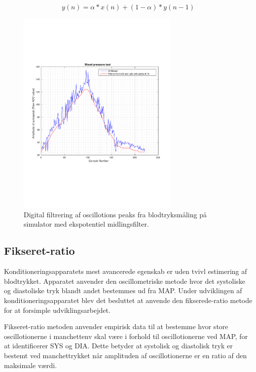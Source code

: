 \begin{equation}
y(n)=\alpha*x(n)+(1-\alpha)*y(n-1)
\label{eq:ekspotentielmidlingsfilter}
\end{equation}
\begin{figure}[H]
	\centering
	\includegraphics[trim={0 0 0 0},clip, width=0.7\textwidth]{billeder/digitalFilterData.pdf}	
	\parbox{10.5cm}{\caption{Digital filtrering af oscillotions peaks fra blodtryksmåling på simulator med ekspotentiel midlingsfilter.}\label{fig:digitalFilterData}}
\end{figure}


\subsection{Fikseret-ratio} \label{Fikseret-ratio}
Konditioneringsapparatets mest avancerede egenskab er uden tvivl estimering af blodtrykket. Apparatet anvender den oscillometriske metode hvor det systoliske og diastoliske tryk blandt andet bestemmes ud fra MAP. Under udviklingen af konditioneringsapparatet blev det besluttet at anvende den fikserede-ratio metode for at forsimple udviklingsarbejdet.

Fikseret-ratio metoden anvender empirisk data til at bestemme hvor store oscillotionerne i manchettenv skal være i forhold til oscillotionerne ved MAP, for at identificerer SYS og DIA. Dette betyder at systolisk og diastolisk tryk er bestemt ved manchettrykket når amplituden af oscillotionerne er en ratio af den maksimale værdi.

